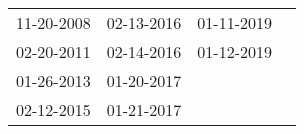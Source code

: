 \begin{supertabular}{llll}
 11-20-2008 &  02-13-2016 &  01-11-2019 \\
 02-20-2011 &  02-14-2016 &  01-12-2019 \\
 01-26-2013 &  01-20-2017 &             \\
 02-12-2015 &  01-21-2017 &             \\
\end{supertabular}
